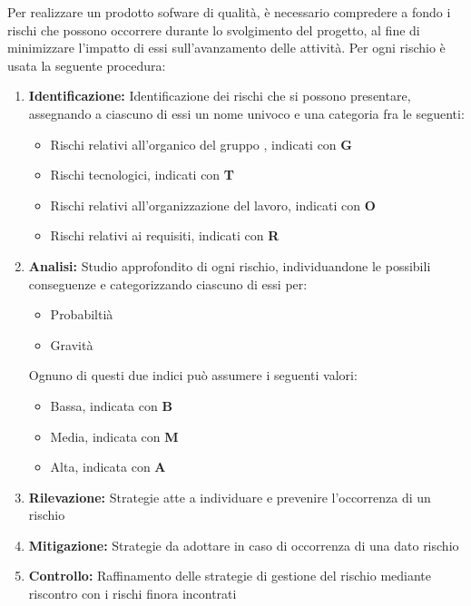 Per realizzare un prodotto sofware di qualità, è necessario
compredere a fondo i rischi che possono occorrere durante lo svolgimento
del progetto, al fine di minimizzare l'impatto di essi sull'avanzamento
delle attività. \newline
Per ogni rischio è usata la seguente procedura:
\begin{enumerate}
    \item \textbf{Identificazione: }
           Identificazione dei rischi che si possono presentare, assegnando a ciascuno di essi un nome univoco e
           una categoria fra le seguenti:
           \begin{itemize}
               \item Rischi relativi all'organico del gruppo \gruppo\space, indicati con \textbf{G}
               \item Rischi tecnologici, indicati con \textbf{T}
               \item Rischi relativi all'organizzazione del lavoro, indicati con \textbf{O}
               \item Rischi relativi ai requisiti, indicati con \textbf{R}
           \end{itemize}
    \item \textbf{Analisi: } Studio approfondito di ogni rischio, individuandone le possibili conseguenze e categorizzando ciascuno di essi per:
           \begin{itemize}
               \item Probabiltià
               \item Gravità
           \end{itemize}
           Ognuno di questi due indici può assumere i seguenti valori:
           \begin{itemize}
               \item Bassa, indicata con \textbf{B}
               \item Media, indicata con \textbf{M}
               \item Alta, indicata con \textbf{A}
           \end{itemize}
    \item \textbf{Rilevazione: }Strategie atte a individuare e prevenire l'occorrenza di un rischio
    \item \textbf{Mitigazione: }Strategie da adottare in caso di occorrenza di una dato rischio
    \item \textbf{Controllo: }Raffinamento delle strategie di gestione del rischio mediante riscontro con i rischi
                              finora incontrati
\end{enumerate}                         
